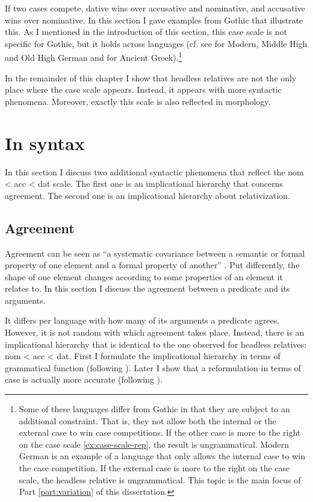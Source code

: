 If two cases compete, dative wins over accusative and nominative, and accusative wins over nominative. In this section I gave examples from Gothic that illustrate this. As I mentioned in the introduction of this section, this case scale is not specific for Gothic, but it holds across languages (cf. see \citealt{pittner1995} for Modern, Middle High and Old High German and \citealt{grosu2003,kakarikos2014} for Ancient Greek).\footnote{
Some of these languages differ from Gothic in that they are subject to an additional constraint. That is, they not allow both the internal or the external case to win case competitions. If the other case is more to the right on the case scale \ref{ex:case-scale-rep}, the result is ungrammatical. Modern German is an example of a language that only allows the internal case to win the case competition. If the external case is more to the right on the case scale, the headless relative is ungrammatical.
This topic is the main focus of Part \ref{part:variation} of this dissertation.}

In the remainder of this chapter I show that headless relatives are not the only place where the case scale appears. Instead, it appears with more syntactic phenomena. Moreover, exactly this scale is also reflected in morphology.


\section{In syntax}\label{sec:impl-hier}

In this section I discuss two additional syntactic phenomena that reflect the \ac{nom} < \ac{acc} < \ac{dat} scale. The first one is an implicational hierarchy that concerns agreement. The second one is an implicational hierarchy about relativization.


\subsection{Agreement}

Agreement can be seen as ``a systematic covariance between a semantic or formal property of one element and a formal property of another'' \citep{steel1978}. Put differently, the shape of one element changes according to some properties of an element it relates to. In this section I discuss the agreement between a predicate and its arguments.

It differs per language with how many of its arguments a predicate agrees. However, it is not random with which agreement takes place. Instead, there is an implicational hierarchy that is identical to the one observed for headless relatives: \ac{nom} < \ac{acc} < \ac{dat}. First I formulate the implicational hierarchy in terms of grammatical function (following \citealt{moravcsik1978}). Later I show that a reformulation in terms of case is actually more accurate (following \citealt{bobaljik2006}).

